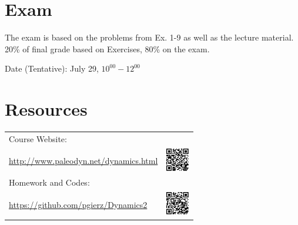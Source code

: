 \documentclass[11pt]{article}
\begin{document}
\section*{Exam}
The exam is based on the problems from Ex. 1-9 as well as the lecture material.
20\% of final grade based on Exercises, 80\% on the exam.

Date (Tentative): July 29, $10^{00}-12^{00}$

\section*{Resources}
\begin{tabular}{m{5cm} | c}
	Course Website: \\ \url{http://www.paleodyn.net/dynamics.html} & \includegraphics[height=30pt]{CourseWebsite.png} \\

\hline
	Homework and Codes: \\ \url{https://github.com/pgierz/Dynamics2} & \includegraphics[height=30pt]{Homework.png}
\end{tabular}
\end{document}

